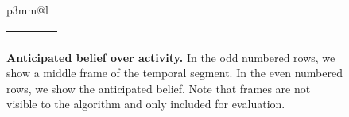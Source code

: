 \begin{figure}[ht]
\begin{tabular}{p{3mm}@{}l}
\begin{tabular}{p{3.2cm}p{3.2cm}p{3.2cm}p{3.2cm}}
{\rotatebox[origin=r]{90}{placing}\hspace{0.9mm}
\rotatebox[origin=r]{90}{closing}\hspace{0.9mm}
\rotatebox[origin=r]{90}{null}\hspace{0.9mm}
\rotatebox[origin=r]{90}{cleaning}}&
\vspace{-10mm}\hspace{-0.9mm}\scalebox{0.72}{
\rotatebox[origin=r]{90}{reaching}\hspace{0.9mm}
\rotatebox[origin=r]{90}{moving}\hspace{0.9mm}
\rotatebox[origin=r]{90}{pouring}\hspace{0.9mm}
\rotatebox[origin=r]{90}{eating}\hspace{0.9mm}
\rotatebox[origin=r]{90}{drinking}\hspace{0.9mm}
\rotatebox[origin=r]{90}{opening}\hspace{0.9mm}
\rotatebox[origin=r]{90}{placing}\hspace{0.9mm}
\rotatebox[origin=r]{90}{closing}\hspace{0.9mm}
\rotatebox[origin=r]{90}{null}\hspace{0.9mm}
\rotatebox[origin=r]{90}{cleaning}}&
\vspace{-10mm}\hspace{-0.9mm}\scalebox{0.72}{
\rotatebox[origin=r]{90}{reaching}\hspace{0.9mm}
\rotatebox[origin=r]{90}{moving}\hspace{0.9mm}
\rotatebox[origin=r]{90}{pouring}\hspace{0.9mm}
\rotatebox[origin=r]{90}{eating}\hspace{0.9mm}
\rotatebox[origin=r]{90}{drinking}\hspace{0.9mm}
\rotatebox[origin=r]{90}{opening}\hspace{0.9mm}
\rotatebox[origin=r]{90}{placing}\hspace{0.9mm}
\rotatebox[origin=r]{90}{closing}\hspace{0.9mm}
\rotatebox[origin=r]{90}{null}\hspace{0.9mm}
\rotatebox[origin=r]{90}{cleaning}}
\end{tabular}
\end{tabular}
\normalsize
\caption{\textbf{Anticipated belief over activity.} In the odd numbered rows, we show a middle frame of the temporal segment. In the even numbered rows, we show the anticipated belief. Note that frames are not visible to the algorithm and only included for evaluation.}
\label{abcd}
\end{figure}

